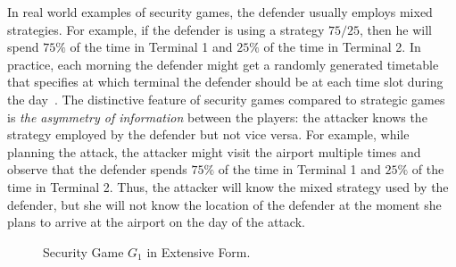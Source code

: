 \documentclass[letterpaper]{article}
\begin{document}
In real world examples of security games, the defender usually employs mixed strategies. For example, if the defender is using a strategy $75/25$, then he will spend $75\%$ of the time in Terminal 1 and $25\%$ of the time in Terminal 2. In practice, each morning the defender might get a randomly generated timetable that specifies at which terminal the defender should be at each time slot during the day~\cite{jtpkrto10interfaces}. The distinctive feature of security games compared to strategic games is {\em the asymmetry of information} between the players: the attacker knows the strategy employed by the defender but not vice versa. For example, while planning the attack, the attacker might visit the airport multiple times and observe that the defender spends $75\%$ of the time in Terminal 1 and $25\%$ of the time in Terminal 2. Thus, the attacker will know the mixed strategy used by the defender, but she will not know the location of the defender at the moment she plans to arrive at the airport on the day of the attack.

\begin{figure}[ht]
\begin{center}
\caption{Security Game $G_1$ in Extensive Form.}\label{extensive-form-game figure}
\end{center}
\end{figure}
\end{document}
